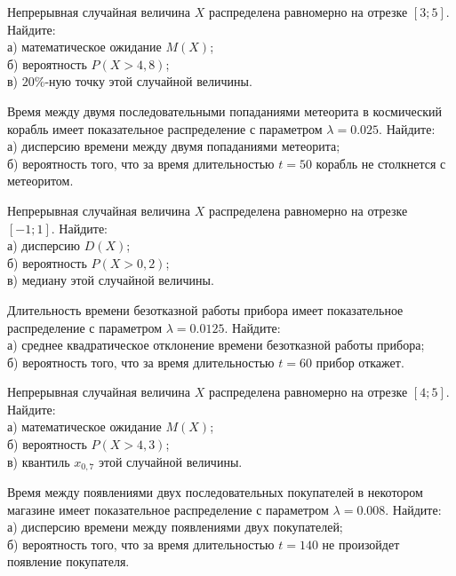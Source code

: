 \vfill

\newpage\setcounter{zad}{0}

\z Непрерывная случайная величина $X$ распределена равномерно на отрезке $[3; 5]$. Найдите: \\ \quad а) математическое ожидание $M(X)$; \\ \quad б) вероятность $P(X>4{,}8)$; \\ \quad в) $20\%$-ную точку этой случайной величины.


\vfill

\z Время между двумя последовательными попаданиями метеорита в космический корабль имеет показательное распределение с параметром $\lambda = 0.025$. Найдите: \\ \quad а) дисперсию времени между двумя попаданиями метеорита; \\ \quad б) вероятность того, что за время длительностью $t = 50$ корабль не столкнется с метеоритом.
 

\vfill

\newpage\setcounter{zad}{0}

\z Непрерывная случайная величина $X$ распределена равномерно на отрезке $[-1; 1]$. Найдите: \\ \quad а) дисперсию $D(X)$; \\ \quad б) вероятность $P(X>0{,}2)$; \\ \quad в) медиану этой случайной величины.


\vfill

\z Длительность времени безотказной работы прибора имеет показательное распределение с параметром $\lambda = 0.0125$. Найдите: \\ \quad а) среднее квадратическое отклонение времени безотказной работы прибора; \\ \quad б) вероятность того, что за время длительностью $t = 60$ прибор  откажет.
 

\vfill

\newpage\setcounter{zad}{0}

\z Непрерывная случайная величина $X$ распределена равномерно на отрезке $[4; 5]$. Найдите: \\ \quad а) математическое ожидание $M(X)$; \\ \quad б) вероятность $P(X>4{,}3)$; \\ \quad в) квантиль $x_{0{,}7}$ этой случайной величины.


\vfill

\z Время между появлениями двух последовательных покупателей в некотором магазине имеет показательное распределение с параметром $\lambda = 0.008$. Найдите: \\ \quad а) дисперсию времени между появлениями двух покупателей; \\ \quad б) вероятность того, что за время длительностью $t = 140$ не произойдет появление покупателя.
 

